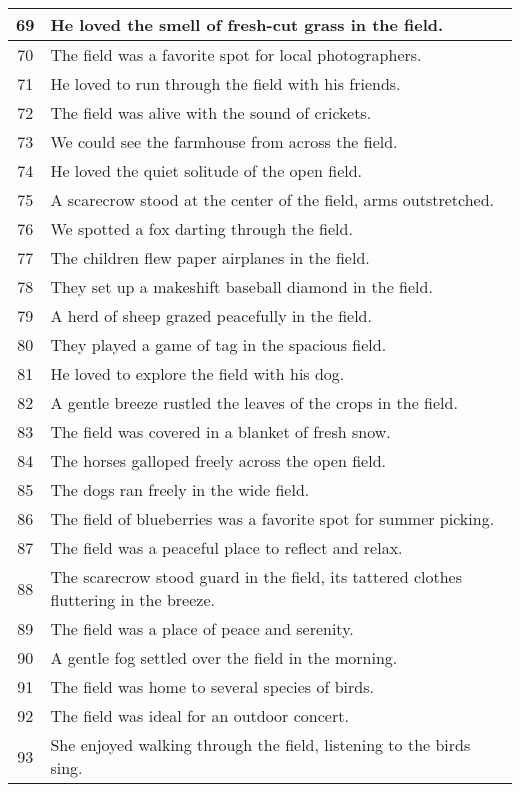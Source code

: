 \begin{longtable}{|c|p{12cm}|}
69 & He loved the smell of fresh-cut grass in the field. \\ \hline
70 & The field was a favorite spot for local photographers. \\ \hline
71 & He loved to run through the field with his friends. \\ \hline
72 & The field was alive with the sound of crickets. \\ \hline
73 & We could see the farmhouse from across the field. \\ \hline
74 & He loved the quiet solitude of the open field. \\ \hline
75 & A scarecrow stood at the center of the field, arms outstretched. \\ \hline
76 & We spotted a fox darting through the field. \\ \hline
77 & The children flew paper airplanes in the field. \\ \hline
78 & They set up a makeshift baseball diamond in the field. \\ \hline
79 & A herd of sheep grazed peacefully in the field. \\ \hline
80 & They played a game of tag in the spacious field. \\ \hline
81 & He loved to explore the field with his dog. \\ \hline
82 & A gentle breeze rustled the leaves of the crops in the field. \\ \hline
83 & The field was covered in a blanket of fresh snow. \\ \hline
84 & The horses galloped freely across the open field. \\ \hline
85 & The dogs ran freely in the wide field. \\ \hline
86 & The field of blueberries was a favorite spot for summer picking. \\ \hline
87 & The field was a peaceful place to reflect and relax. \\ \hline
88 & The scarecrow stood guard in the field, its tattered clothes fluttering in the breeze. \\ \hline
89 & The field was a place of peace and serenity. \\ \hline
90 & A gentle fog settled over the field in the morning. \\ \hline
91 & The field was home to several species of birds. \\ \hline
92 & The field was ideal for an outdoor concert. \\ \hline
93 & She enjoyed walking through the field, listening to the birds sing. \\ \hline

\end{longtable}
